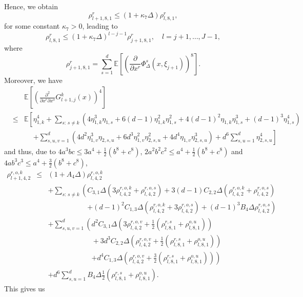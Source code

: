 \documentclass[11pt,a4paper]{amsart}
\theoremstyle{plain}
\theoremstyle{definition}
\theoremstyle{remark}
\numberwithin{equation}{section}
\newcommand*{\EE}{\mathbb E}
\begin{document}
Hence, we obtain
\[
\rho_{l+1,8,1}^{r}\leq (1+\kappa_{7}\Delta)\rho_{l,8,1}^{r},
\]
for some constant $\kappa_{7}>0$, leading to 
\[
\rho_{l,8,1}^{r}\leq(1+\kappa_{7}\Delta)^{l-j-1}\rho_{j+1,8,1}^{r}
,\quad l=j+1,\ldots,J-1,
\]
where 
\[
\rho_{j+1,8,1}^{r}=\sum_{s=1}^d\EE\left[\left(\frac{\partial}{\partial x^r}\Phi_{\Delta}^s\left(x,\xi_{j+1}\right)\right)^{8}\right].
\]
Moreover, we have
\begin{eqnarray*}
&&\EE\left[\left(\frac{\partial^2}{\partial x^r\partial x^o}G_{l+1,j}^k(x)\right)^{4}\right]\\
&\leq&\EE\left[\eta_{1,k}^4+\sum_{s:\,s\neq k}\left(4\eta_{1,k}^3\eta_{1,s}+6(d-1)\eta_{1,k}^2\eta_{1,s}^2+4(d-1)^2\eta_{1,k}\eta_{1,s}^3+(d-1)^3\eta_{1,s}^4\right)\right.\\
&&\phantom{\EE\left[\right.}\left.+\sum_{s,u,v=1}^d\left(4d^2\eta_{1,v}^3\eta_{2,s,u}+6d^3\eta_{1,v}^2\eta_{2,s,u}^2+4d^4\eta_{1,v}\eta_{2,s,u}^3\right)+d^6\sum_{s,u=1}^d\eta_{2,s,u}^4\right]
\end{eqnarray*}
and thus, due to $4a^3bc\le3a^4+\frac{1}{2}\left(b^8+c^8\right)$, $2a^2b^2c^2\le a^4+\frac{1}{2}\left(b^8+c^8\right)$ and $4ab^3c^3\le a^4+\frac{3}{2}\left(b^8+c^8\right)$,
\begin{eqnarray*}
\rho_{l+1,4,2}^{r,o,k}&\le & (1+A_{4}\Delta)\rho_{l,4,2}^{r,o,k}\\
&&
+\sum_{s:\,s\neq k}\left(C_{3,1}\Delta(3\rho_{l,4,2}^{r,o,k}+\rho_{l,4,2}^{r,o,s})+3(d-1)C_{2,2}\Delta(\rho_{l,4,2}^{r,o,k}+\rho_{l,4,2}^{r,o,s})\right.\\
&&\phantom{+\sum_{s:\,s\neq k}\left(\right.}\left.+(d-1)^2C_{1,3}\Delta(\rho_{l,4,2}^{r,o,k}+3\rho_{l,4,2}^{r,o,s})+ (d-1)^3B_{4}\Delta\rho_{l,4,2}^{r,o,s}\right)\\
&&+\sum_{s,u,v=1}^d\left(d^2C_{3,1}\Delta\left(3\rho_{l,4,2}^{r,o,v}+\frac{1}{2}\left(\rho_{l,8,1}^{r,s}+\rho_{l,8,1}^{o,u}\right)\right)\right.\\
&&\phantom{+\sum_{s,u,v=1}^d\left(\right.}+3d^3C_{2,2}\Delta\left(\rho_{l,4,2}^{r,o,v}+\frac{1}{2}\left(\rho_{l,8,1}^{r,s}+\rho_{l,8,1}^{o,u}\right)\right)\\
&&\phantom{+\sum_{s,u,v=1}^d\left(\right.}\left.+d^4C_{1,3}\Delta\left(\rho_{l,4,2}^{r,o,v}+\frac{3}{2}\left(\rho_{l,8,1}^{r,s}+\rho_{l,8,1}^{o,u}\right)\right)\right)\\
&&+d^6\sum_{s,u=1}^dB_{4}\Delta\frac{1}{2}\left(\rho_{l,8,1}^{r,s}+\rho_{l,8,1}^{o,u}\right).
\end{eqnarray*}
This gives us
\end{document}
